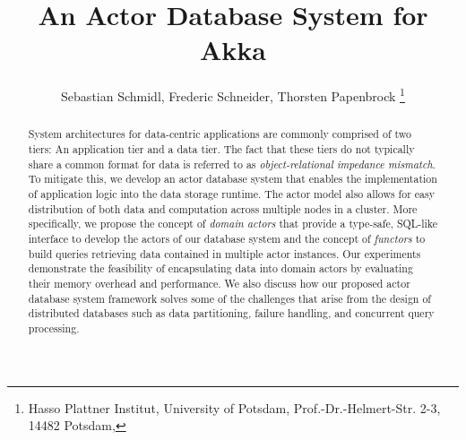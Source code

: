 \documentclass[english,utf8,biblatex]{lni-tex/lni}
\author[Frederic Schneider \and Sebastian Schmidl \and Thorsten Papenbrock]{%
  Sebastian Schmidl, Frederic Schneider, Thorsten Papenbrock%
  \footnote{%
    Hasso Plattner Institut, University of Potsdam, Prof.-Dr.-Helmert-Str. 2-3, 14482 Potsdam, %
    \email{{sebastian.schmidl,frederic.schneider,thorsten.papenbrock}@student.hpi.de}%
  }%
}
\title[An Actor Database System for Akka]{An Actor Database System for Akka}
\begin{document}
\maketitle

\setcounter{footnote}{1}

\begin{abstract}
  System architectures for data-centric applications are commonly comprised of two tiers:
  An application tier and a data tier.
  The fact that these tiers do not typically share a common format for data is referred to as \textit{object-relational impedance mismatch}.
  To mitigate this, we develop an actor database system that enables the implementation of application logic into the data storage runtime. 
  The actor model also allows for easy distribution of both data and computation across multiple nodes in a cluster.
  More specifically, we propose the concept of \emph{domain actors} that provide a type-safe, SQL-like interface to develop the actors of our database system and the concept of \emph{\glspl{functor}} to build queries retrieving data contained in multiple actor instances.
  Our experiments demonstrate the feasibility of encapsulating data into domain actors by evaluating their memory overhead and performance.
  We also discuss how our proposed actor database system framework solves some of the challenges that arise from the design of distributed databases such as data partitioning, failure handling, and concurrent query processing.
\end{abstract}




\printbibliography
\end{document}
